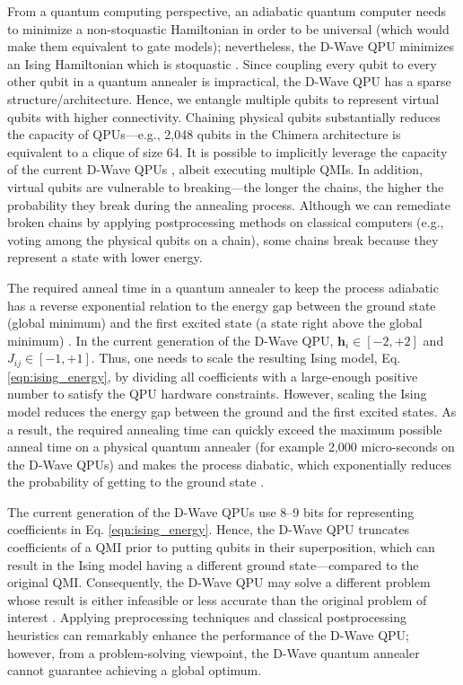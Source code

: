 \documentclass[fleqn,10pt]{wlscirep}
\begin{document}
From a quantum computing perspective, an adiabatic quantum computer needs to minimize a non-stoquastic Hamiltonian in order to be universal (which would make them equivalent to gate models); nevertheless, the D-Wave QPU minimizes an Ising Hamiltonian which is stoquastic \cite{nishimori2017exponential,vinci2017non}.
Since coupling every qubit to every other qubit in a quantum annealer is impractical, the D-Wave QPU has a sparse structure/architecture. Hence, we entangle multiple qubits to represent virtual qubits with higher connectivity. Chaining physical qubits substantially reduces the capacity of QPUs—e.g., 2,048 qubits in the Chimera architecture is equivalent to a clique of size 64.
It is possible to implicitly leverage the capacity of the current D-Wave QPUs \cite{okada2019improving}, albeit executing multiple QMIs. In addition, virtual qubits are vulnerable to breaking—the longer the chains, the higher the probability they break during the annealing process. Although we can remediate broken chains by applying postprocessing methods on classical computers (e.g., voting among the physical qubits on a chain), some chains break because they represent a state with lower energy.

The required anneal time in a quantum annealer to keep the process adiabatic has a reverse exponential relation to the energy gap between the ground state (global minimum) and the first excited state (a state right above the global minimum) \cite{nishimori2017exponential}. In the current generation of the D-Wave QPU, $\mathbf{h}_i \in [-2,+2]$ and $J_{ij} \in [-1,+1]$. Thus, one needs to scale the resulting Ising model, Eq. \eqref{eqn:ising_energy}, by dividing all coefficients with a large-enough positive number to satisfy the QPU hardware constraints. However, scaling the Ising model reduces the energy gap between the ground and the first excited states. As a result, the required annealing time can quickly exceed the maximum possible anneal time on a physical quantum annealer (for example 2,000 micro-seconds on the D-Wave QPUs) and makes the process diabatic, which exponentially reduces the probability of getting to the ground state \cite{nishimori2017exponential}.

The current generation of the D-Wave QPUs use 8–9 bits for representing coefficients in Eq. \eqref{eqn:ising_energy}. Hence, the D-Wave QPU truncates coefficients of a QMI prior to putting qubits in their superposition, which can result in  the Ising model having a different ground state—compared to the original QMI. Consequently, the D-Wave QPU may solve a different problem whose result is either infeasible or less accurate than the original problem of interest \cite{pudenz2015quantum,dorband2018extending}. Applying preprocessing techniques \cite{pelofske2019optimizing} and classical postprocessing heuristics \cite{dorband2018method} can remarkably enhance the performance of the D-Wave QPU; however, from a problem-solving viewpoint, the D-Wave quantum annealer cannot guarantee achieving a global optimum.
\end{document}
